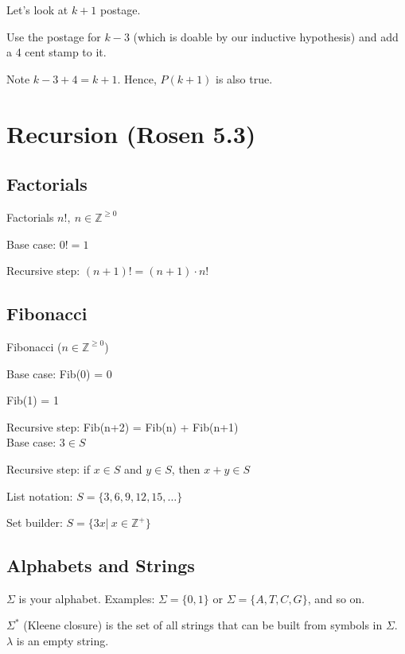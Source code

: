 \documentclass[english,openany]{book}
\begin{document}
    Let's look at $k + 1$ postage.

    Use the postage for $k - 3$ (which is doable by our inductive hypothesis) and add a 4 cent stamp to it.

    Note $k - 3 + 4 = k + 1$. Hence, $P(k+1)$ is also true.

    \newpage

    \section{Recursion (Rosen 5.3)}

    \subsection{Factorials}

    Factorials $n!,\ n \in \mathbb Z^{\geq 0}$

    Base case: $0! = 1$

    Recursive step: $(n+1)! = (n+1) \cdot n!$\\

    \subsection{Fibonacci}

    Fibonacci ($n \in \mathbb Z^{\geq 0}$)

    Base case: Fib(0) = 0

    Fib(1) = 1

    Recursive step: Fib(n+2) = Fib(n) + Fib(n+1)\\

    Base case: $3 \in S$

    Recursive step:
    \qquad if $x \in S$ and $y \in S$, then $x+y \in S$

    List notation: $S =\{3, 6, 9, 12, 15, \dots\} $

    Set builder: $S = \{3x |\ x \in \mathbb Z^+\}$\\

    \subsection{Alphabets and Strings}

    $\Sigma$ is your alphabet. Examples: $\Sigma = \{0,1\}$  or $\Sigma = \{A,T,C,G\}$, and so on.

    $\Sigma^*$ (Kleene closure) is the set of all strings that can be built from symbols in $\Sigma$. $\lambda$ is an empty string.
\end{document}
